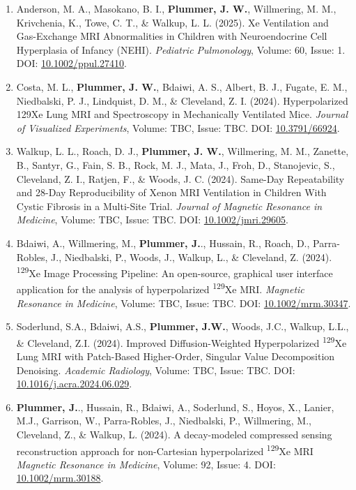 \documentclass[12pt,]{scrartcl}
\begin{document}
\begin{enumerate}
    \item Anderson, M. A., Masokano, B. I., \textbf{Plummer, J. W.}, Willmering, M. M., Krivchenia, K., Towe, C. T., \& Walkup, L. L. (2025). Xe Ventilation and Gas-Exchange MRI Abnormalities in Children with Neuroendocrine Cell Hyperplasia of Infancy (NEHI). \textit{Pediatric Pulmonology}, Volume: 60, Issue: 1. DOI: \href{https://doi.org/10.1002/ppul.27410}{10.1002/ppul.27410}.


    \item Costa, M. L., \textbf{Plummer, J. W.}, Bdaiwi, A. S., Albert, B. J., Fugate, E. M., Niedbalski, P. J., Lindquist, D. M., \& Cleveland, Z. I. (2024). Hyperpolarized 129Xe Lung MRI and Spectroscopy in Mechanically Ventilated Mice. \textit{Journal of Visualized Experiments}, Volume: TBC, Issue: TBC. DOI: \href{https://app.jove.com/t/66924/hyperpolarized-129xe-lung-mri-spectroscopy-mechanically-ventilated}{10.3791/66924}.

    \item Walkup, L. L., Roach, D. J., \textbf{Plummer, J. W.}, Willmering, M. M., Zanette, B., Santyr, G., Fain, S. B., Rock, M. J., Mata, J., Froh, D., Stanojevic, S., Cleveland, Z. I., Ratjen, F., \& Woods, J. C. (2024). Same-Day Repeatability and 28-Day Reproducibility of Xenon MRI Ventilation in Children With Cystic Fibrosis in a Multi-Site Trial. \textit{Journal of Magnetic Resonance in Medicine}, Volume: TBC, Issue: TBC. DOI: \href{https://doi.org/10.1002/jmri.29605}{10.1002/jmri.29605}.

    \item Bdaiwi, A., Willmering, M., \textbf{Plummer, J.}., Hussain, R., Roach, D., Parra-Robles, J., Niedbalski, P., Woods, J., Walkup, L., \& Cleveland, Z. (2024). \textsuperscript{129}Xe Image Processing Pipeline: An open-source, graphical user interface application for the analysis of hyperpolarized \textsuperscript{129}Xe MRI. \textit{Magnetic Resonance in Medicine}, Volume: TBC, Issue: TBC. DOI: \href{https://doi.org/10.1002/mrm.30347}{10.1002/mrm.30347}.
  
    \item Soderlund, S.A., Bdaiwi, A.S., \textbf{Plummer, J.W.}, Woods, J.C., Walkup, L.L., \& Cleveland, Z.I. (2024). Improved Diffusion-Weighted Hyperpolarized \textsuperscript{129}Xe Lung MRI with Patch-Based Higher-Order, Singular Value Decomposition Denoising. \textit{Academic Radiology}, Volume: TBC, Issue: TBC. DOI: \href{https://doi.org/10.1016/j.acra.2024.06.029}{10.1016/j.acra.2024.06.029}.
  
    \item  \textbf{Plummer, J.}., Hussain, R., Bdaiwi, A., Soderlund, S., Hoyos, X., Lanier, M.J., Garrison, W., Parra-Robles, J., Niedbalski, P., Willmering, M., Cleveland, Z., \& Walkup, L. (2024). A decay-modeled compressed sensing reconstruction approach for non-Cartesian hyperpolarized \textsuperscript{129}Xe MRI \textit{Magnetic Resonance in Medicine}, Volume: 92, Issue: 4.
    DOI: \href{https://doi.org/10.1002/mrm.30188}{10.1002/mrm.30188}.


\end{enumerate}
\end{document}
